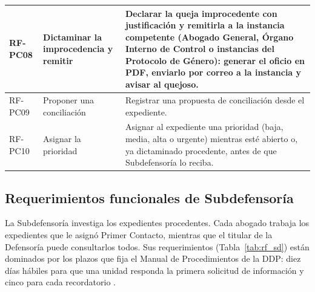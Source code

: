 \begin{longtable}{|p{1.5cm}|p{3.6cm}|p{9.0cm}|}
		RF-PC08 & Dictaminar la improcedencia y remitir & Declarar la queja improcedente con
		justificación y remitirla a la instancia competente (Abogado General, Órgano Interno de
		Control o instancias del Protocolo de Género): generar el oficio en PDF, enviarlo por correo
		a la instancia y avisar al quejoso. \\ \hline

		RF-PC09 & Proponer una conciliación & Registrar una propuesta de conciliación desde el
		expediente. \\ \hline

		RF-PC10 & Asignar la prioridad & Asignar al expediente una prioridad (baja, media, alta o
		urgente) mientras esté abierto o, ya dictaminado procedente, antes de que Subdefensoría lo
		reciba. \\ \hline
	\end{longtable}

	\normalsize

	\subsection{Requerimientos funcionales de Subdefensoría}
	La Subdefensoría investiga los expedientes procedentes. Cada abogado trabaja los expedientes que
	le asignó Primer Contacto, mientras que el titular de la Defensoría puede consultarlos todos.
	Sus requerimientos (Tabla~\ref{tab:rf_sd}) están dominados por los plazos que fija el Manual de
	Procedimientos de la DDP: diez días hábiles para que una unidad responda la primera solicitud de
	información y cinco para cada recordatorio \cite{ipn_manual_procedimientos_ddp}.

	\small
	\renewcommand{\arraystretch}{1.2}

